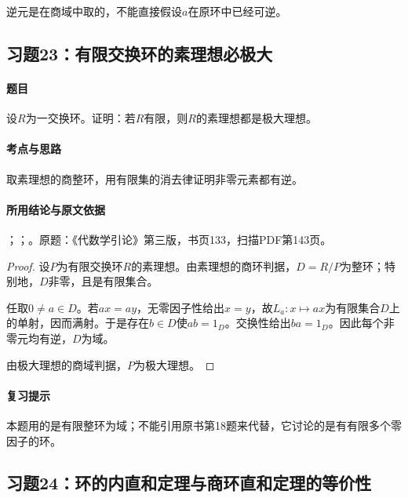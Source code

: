 逆元是在商域中取的，不能直接假设$a$在原环中已经可逆。



\subsection{习题23：有限交换环的素理想必极大}

\label{ex:3:23}

\paragraph{题目}

设$R$为一交换环。证明：若$R$有限，则$R$的素理想都是极大理想。

\paragraph{考点与思路}

取素理想的商整环，用有限集的消去律证明非零元素都有逆。

\paragraph{所用结论与原文依据}

；；。原题：《代数学引论》第三版，书页133，扫描PDF第143页。


\begin{proof}

设$P$为有限交换环$R$的素理想。由素理想的商环判据，$D=R/P$为整环；特别地，$D$非零，且是有限集合。

任取$0\ne a\in D$。若$ax=ay$，无零因子性给出$x=y$，故$L_a:x\mapsto ax$为有限集合$D$上的单射，因而满射。于是存在$b\in D$使$ab=1_D$。交换性给出$ba=1_D$。因此每个非零元均有逆，$D$为域。

由极大理想的商域判据，$P$为极大理想。

\end{proof}

\paragraph{复习提示}

本题用的是有限整环为域；不能引用原书第18题来代替，它讨论的是有有限多个零因子的环。



\subsection{习题24：环的内直和定理与商环直和定理的等价性}

